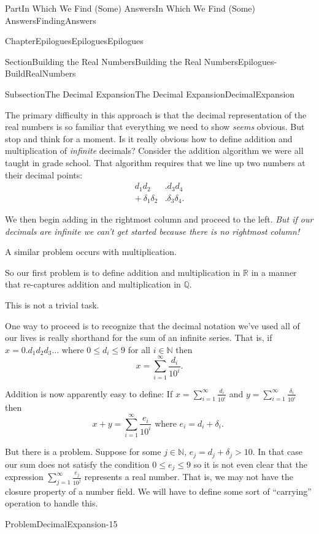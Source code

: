 \documentclass[oneside,10pt,]{book}
\numberwithin{equation}{part}
\newcommand{\RR}{\mathbb {R}}
\newcommand{\QQ}{\mathbb {Q}}
\newcommand{\NN}{\mathbb {N}}
\newcommand{\amp}{&}
\begin{document}
\begin{partptx}{Part}{In Which We Find (Some) Answers}{}{In Which We Find (Some) Answers}{}{}{FindingAnswers}
\begin{chapterptx}{Chapter}{Epilogues}{}{Epilogues}{}{}{Epilogues}
\begin{sectionptx}{Section}{Building the Real Numbers}{}{Building the Real Numbers}{}{}{Epilogues-BuildRealNumbers}
\begin{subsectionptx}{Subsection}{The Decimal Expansion}{}{The Decimal Expansion}{}{}{DecimalExpansion}
\par
The primary difficulty in this approach is that the decimal representation of the real numbers is so familiar that everything we need to show \emph{seems} obvious.  But stop and think for a moment.  Is it really obvious how to define addition and multiplication of \emph{infinite} decimals? Consider the addition algorithm we were all taught in grade school.  That algorithm requires that we line up two numbers at their decimal points:%
\begin{align*}
d_1d_2\amp .d_3d_4\\
+\   \delta_1\delta_2\amp .\delta_3\delta_4\text{.}
\end{align*}
%
\par
We then begin adding in the rightmost column and proceed to the left.  \emph{But if our decimals are infinite we can't get started because there is no rightmost column!}%
\par
A similar problem occurs with multiplication.%
\par
So our first problem is to define addition and multiplication in \(\RR\) in a manner that re-captures addition and multiplication in \(\QQ\).%
\par
This is not a trivial task.%
\par
One way to proceed is to recognize that the decimal notation we've used all of our lives is really shorthand for the sum of an infinite series.  That is, if \(x=0.d_1d_2d_3\ldots\) where \(0\leq d_i\leq 9\) for all \(i\in\NN\) then%
\begin{equation*}
x=\sum_{i=1}^\infty\frac{d_i}{10^i}\text{.}
\end{equation*}
%
\par
Addition is now apparently easy to define: If \(x=\sum_{i=1}^\infty\frac{d_i}{10^i}\) and \(y=\sum_{i=1}^\infty\frac{\delta_i}{10^i}\) then%
\begin{equation*}
x+y= \sum_{i=1}^\infty\frac{e_i}{10^i} \text{ where \(e_i =d_i+\delta_i\). }
\end{equation*}
%
\par
But there is a problem.  Suppose for some \(j\in\NN\), \(e_j=d_j+\delta_j>10\).  In that case our sum does not satisfy the condition \(0\leq e_j\leq 9\) so it is not even clear that the expression \(\sum_{j=1}^\infty\frac{e_j}{10^j}\) represents a real number.  That is, we may not have the closure property of a number field.  We will have to define some sort of ``carrying'' operation to handle this.%
\begin{problem}{Problem}{}{DecimalExpansion-15}%

\end{problem}
\end{subsectionptx}
\end{sectionptx}
\end{chapterptx}
\end{partptx}
\end{document}

